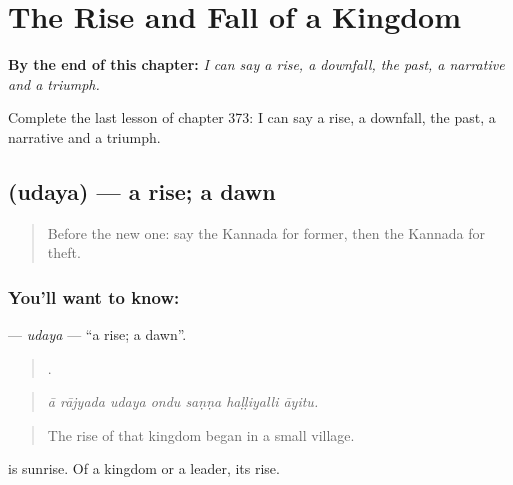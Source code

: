 
\chapter{The Rise and Fall of a Kingdom}
\label{ch:ka-the-rise-and-fall-of-a-kingdom}

\begin{chapteropening}
\textbf{By the end of this chapter:} \emph{I can say a rise, a downfall, the past, a narrative and a triumph.}

Complete the last lesson of chapter 373: I can say a rise, a downfall, the past, a narrative and a triumph.
\end{chapteropening}

\section[\texorpdfstring{\kn{ಉದಯ} (udaya)}{ಉದಯ (udaya)}]{ (udaya) — a rise; a dawn}

\label{lesson:KA-C373-udaya}



\begin{quote}
Before the new one: say the Kannada for former, then the Kannada for theft.
\end{quote}

\subsection*{You'll want to know: }
\textbf{} — \emph{udaya} — \textquotedblleft{}a rise; a dawn\textquotedblright{}.

\begin{quote}
      .
\end{quote}

\begin{quote}
\emph{ā rājyada udaya ondu saṇṇa haḷḷiyalli āyitu.}
\end{quote}

\begin{quote}
The rise of that kingdom began in a small village.
\end{quote}

 is sunrise. Of a kingdom or a leader, its rise.

